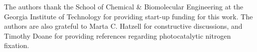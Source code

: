 \documentclass[journal=ascecg,manuscript=article,articletitle=true]{achemso}
\begin{document}



\begin{acknowledgement}

The authors thank the School of Chemical \& Biomolecular Engineering 
at the Georgia Institute of Technology for providing start-up funding
for this work. The authors are also grateful to Marta C. Hatzell for constructive discussions, and Timothy Doane for providing references regarding photocatalytic nitrogen fixation.

\end{acknowledgement}
\end{document}
